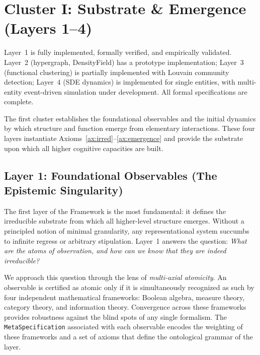 \section{Cluster I: Substrate \& Emergence (Layers 1--4)}
\label{sec:cluster1}

\begin{tcolorbox}[colback=green!5, colframe=green!50, title=Status: Partially Implemented]
Layer~1 is fully implemented, formally verified, and empirically validated. Layer~2 (hypergraph, DensityField) has a prototype implementation; Layer~3 (functional clustering) is partially implemented with Louvain community detection; Layer~4 (SDE dynamics) is implemented for single entities, with multi-entity event-driven simulation under development. All formal specifications are complete.
\end{tcolorbox}

The first cluster establishes the foundational observables and the initial dynamics by which structure and function emerge from elementary interactions. These four layers instantiate Axioms~\ref{ax:irred}--\ref{ax:emergence} and provide the substrate upon which all higher cognitive capacities are built.

\subsection{Layer 1: Foundational Observables (The Epistemic Singularity)}
\label{subsec:layer1}

The first layer of the \Apeiron{} Framework is the most fundamental: it defines the irreducible substrate from which all higher-level structure emerges. Without a principled notion of minimal granularity, any representational system succumbs to infinite regress or arbitrary stipulation. Layer~1 answers the question: \emph{What are the atoms of observation, and how can we know that they are indeed irreducible?}

We approach this question through the lens of \emph{multi-axial atomicity}. An observable is certified as atomic only if it is simultaneously recognized as such by four independent mathematical frameworks: Boolean algebra, measure theory, category theory, and information theory. Convergence across these frameworks provides robustness against the blind spots of any single formalism. The \texttt{MetaSpecification} associated with each observable encodes the weighting of these frameworks and a set of axioms that define the ontological grammar of the layer.

